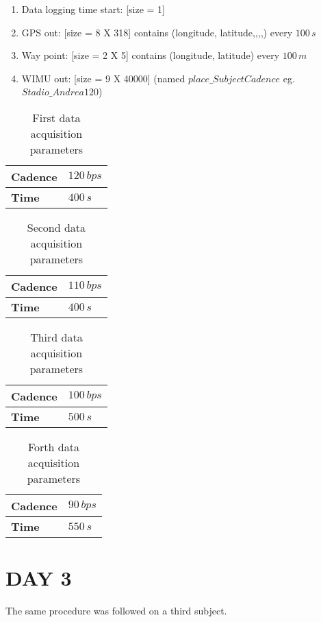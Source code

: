 \documentclass[a4paper,twoside,10pt]{report}
\begin{document}
\begin{enumerate}
	\item Data logging time start: [size = 1] 
	\item GPS out: [size = 8 X 318] contains (longitude, latitude,,,,) every $100\,s$
	\item Way point: [size = 2 X 5] contains (longitude, latitude) every $100\,m$
	\item WIMU out: [size = 9 X 40000] (named $place\_SubjectCadence$ eg. $Stadio\_Andrea120$)
\end{enumerate}

\begin{table}[h]
	\centering
		\begin{tabular}{|l|l|}
		  \hline
			\textbf{Cadence} & $120\,bps$\\
			\hline
			\textbf{Time} & $400\,s$\\
			\hline
		\end{tabular}
	\caption{First data acquisition parameters}
	\label{tab:FirstDataAcquisitionParametersAndrea}
\end{table}

\begin{table}[h]
	\centering
		\begin{tabular}{|l|l|}
		  \hline
			\textbf{Cadence} & $110\,bps$\\
			\hline
			\textbf{Time} & $400\,s$\\
			\hline
		\end{tabular}
	\caption{Second data acquisition parameters}
	\label{tab:SecondDataAcquisitionParametersAndrea}
\end{table}

\begin{table}[h]
	\centering
		\begin{tabular}{|l|l|}
		  \hline
			\textbf{Cadence} & $100\,bps$\\
			\hline
			\textbf{Time} & $500\,s$\\
			\hline
		\end{tabular}
	\caption{Third data acquisition parameters}
	\label{tab:ThirdDataAcquisitionParametersAndrea}
\end{table}

\begin{table}[h]
	\centering
		\begin{tabular}{|l|l|}
		  \hline
			\textbf{Cadence} & $90\,bps$\\
			\hline
			\textbf{Time} & $550\,s$\\
			\hline
		\end{tabular}
	\caption{Forth data acquisition parameters}
	\label{tab:ForthDataAcquisitionParametersAndrea}
\end{table}

\section{DAY 3}
The same procedure was followed on a third subject.
\end{document}
